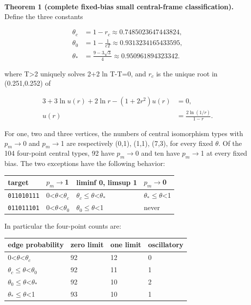 \documentclass[11pt]{article}
\begin{document}
\textbf{Theorem 1 (complete fixed-bias small central-frame classification).} Define the three constants

\[
\begin{aligned}\theta_c&=1-r_c\approx0.7485023647443824,\\
\theta_0&=1-\frac1{eT}\approx0.9313234165433595,\\
\theta_*&=\frac{9-3\sqrt3}{4}\approx0.950961894323342.\end{aligned}
\]

where T>2 uniquely solves 2+2 ln T-T=0, and $r_{c}$ is the unique root in (0.251,0.252) of

\[
\begin{aligned}3+3\ln u(r)+2\ln r-(1+2r^2)u(r)&=0,\\u(r)&=\frac{2\ln(1/r)}{1-r}.\end{aligned}
\]

For one, two and three vertices, the numbers of central isomorphism types with $p_m$\ensuremath{\to}0 and $p_m$\ensuremath{\to}1 are respectively (0,1), (1,1), (7,3), for every fixed $\theta$. Of the 104 four-point central types, 92 have $p_m$\ensuremath{\to}0 and ten have $p_m$\ensuremath{\to}1 at every fixed bias. The two exceptions have the following behavior:

\begin{center}\small
\begin{tabularx}{\linewidth}{XXXX}
\toprule
target & $p_m$\ensuremath{\to}1 & liminf 0, limsup 1 & $p_m$\ensuremath{\to}0\\
\midrule
\texttt{011010111} & 0<$\theta$<$\theta_{c}$ & $\theta_{c}$\ensuremath{\leq}$\theta$<$\theta_{*}$ & $\theta_{*}$\ensuremath{\leq}$\theta$<1\\
\texttt{011011101} & 0<$\theta$<$\theta_{0}$ & $\theta_{0}$\ensuremath{\leq}$\theta$<1 & never\\
\bottomrule
\end{tabularx}
\end{center}

In particular the four-point counts are:

\begin{center}\small
\begin{tabularx}{\linewidth}{XXXX}
\toprule
edge probability & zero limit & one limit & oscillatory\\
\midrule
0<$\theta$<$\theta_{c}$ & 92 & 12 & 0\\
$\theta_{c}$\ensuremath{\leq}$\theta$<$\theta_{0}$ & 92 & 11 & 1\\
$\theta_{0}$\ensuremath{\leq}$\theta$<$\theta_{*}$ & 92 & 10 & 2\\
$\theta_{*}$\ensuremath{\leq}$\theta$<1 & 93 & 10 & 1\\
\bottomrule
\end{tabularx}
\end{center}
\end{document}
